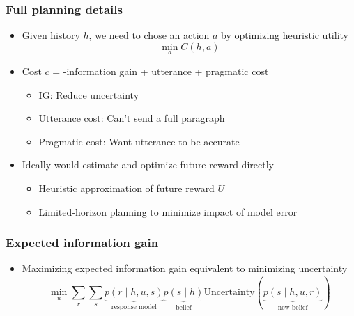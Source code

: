 \documentclass{beamer}
\begin{document}
\begin{frame}
\frametitle{Full planning details}
\begin{itemize}
\item Given history $h$,
we need to chose an action $a$ by optimizing heuristic utility
\begin{equation*}
\min_a C(h, a)
\end{equation*}
\item Cost $c$ = -information gain + utterance + pragmatic cost
    \begin{itemize}
    \item IG: Reduce uncertainty
    \item Utterance cost: Can't send a full paragraph
    \item Pragmatic cost: Want utterance to be accurate
    \end{itemize}
\item Ideally would estimate and optimize future reward directly
    \begin{itemize}
    \item Heuristic approximation of future reward $U$
    \item Limited-horizon planning to minimize impact of model error
    \end{itemize}
\end{itemize}
\end{frame}

\begin{frame}
\frametitle{Expected information gain}
\begin{itemize}
\item Maximizing expected information gain equivalent to minimizing uncertainty
$$\min_u \sum_r\sum_s
    \underbrace{p(r\mid h,u,s)}_{\text{response model}}
    \underbrace{p(s\mid h)}_{\text{belief}}
    \text{Uncertainty}(\underbrace{p(s \mid h,u,r)}_{\text{new belief}})$$
\end{itemize}
\end{frame}
\end{document}
